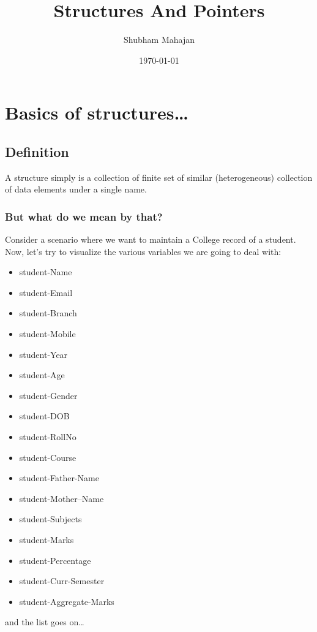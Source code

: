 \documentclass[11pt]{article}
\author{Shubham Mahajan}
\date{\today}
\title{Structures And Pointers}
\begin{document}
\maketitle
\tableofcontents


\section{Basics of structures…}
\label{sec:org2c4f66a}

\subsection{Definition}
\label{sec:orga11cd07}

A structure simply is a collection of finite set of similar (heterogeneous)
collection of data elements under a single name.

\subsubsection{But what do we mean by that?}
\label{sec:org6ad2c07}

Consider a scenario where we want to maintain a College record of a student.
Now, let’s try to visualize the various variables we are going to deal with:

\begin{itemize}
\item student-Name
\item student-Email
\item student-Branch
\item student-Mobile
\item student-Year
\item student-Age
\item student-Gender
\item student-DOB
\item student-RollNo
\item student-Course
\item student-Father-Name
\item student-Mother–Name
\item student-Subjects
\item student-Marks
\item student-Percentage
\item student-Curr-Semester
\item student-Aggregate-Marks
\end{itemize}

and the list goes on…
\end{document}
